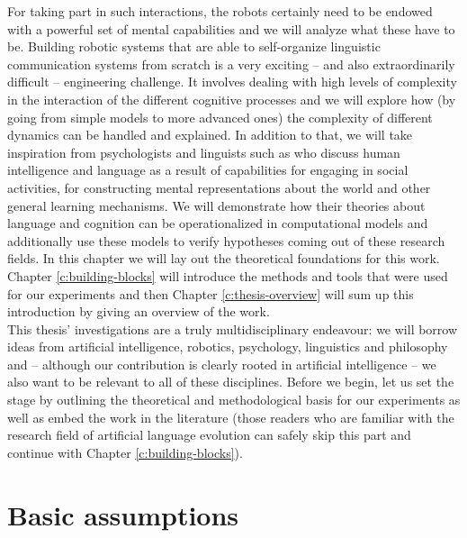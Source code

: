 For taking part in such interactions, the robots certainly need to be
endowed with a powerful set of mental capabilities and we will analyze
what these have to be. Building robotic systems that are able to
self-organize linguistic communication systems from scratch is a very
exciting -- and also extraordinarily difficult -- engineering
challenge. It involves dealing with high levels of complexity in the
interaction of the different cognitive processes and we will explore
how (by going from simple models to more advanced ones) the complexity
of different dynamics can be handled and explained. In addition to
that, we will take inspiration from psychologists and linguists such
as
\cite{tomasello03constructing,tomasello99cultural,tomasello08origins,bloom00how-children,bowerman01language}
who discuss human intelligence and language as a result of
capabilities for engaging in social activities, for constructing
mental representations about the world and other general learning
mechanisms. We will demonstrate how their theories about language and
cognition can be operationalized in computational models and
additionally use these models to verify hypotheses coming out of these
research fields. In this chapter we will lay out the theoretical
foundations for this work. Chapter \ref{c:building-blocks} will
introduce the methods and tools that were used for our experiments and
then Chapter \ref{c:thesis-overview} will sum up this introduction by
giving an overview of the work.\\

\noindent This thesis' investigations are a truly multidisciplinary endeavour:
we will borrow ideas from artificial intelligence, robotics, 
psychology, linguistics and philosophy and -- although our
contribution is clearly rooted in artificial intelligence -- we also
want to be relevant to all of these disciplines. Before we begin, let
us set the stage by outlining the theoretical and methodological basis
for our experiments as well as embed the work in the literature (those
readers who are familiar with the research field of artificial
language evolution can safely skip this part and continue with Chapter
\ref{c:building-blocks}).



\section{Basic assumptions}
\label{s:basic-assumptions}

